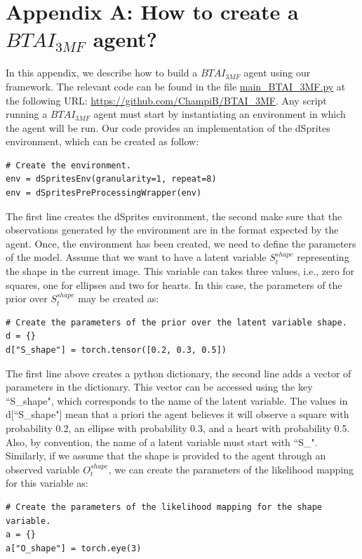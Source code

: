 \documentclass[twoside,11pt]{article}
\begin{document}

\vskip 0.2in


\section*{Appendix A: How to create a $BTAI_{3MF}$ agent?}

In this appendix, we describe how to build a $BTAI_{3MF}$ agent using our framework. The relevant code can be found in the file \url{main_BTAI_3MF.py} at the following URL: \url{https://github.com/ChampiB/BTAI_3MF}. Any script running a $BTAI_{3MF}$ agent must start by instantiating an environment in which the agent will be run. Our code provides an implementation of the dSprites environment, which can be created as follow:
\begin{verbatim}
# Create the environment.
env = dSpritesEnv(granularity=1, repeat=8)
env = dSpritesPreProcessingWrapper(env)
\end{verbatim}
The first line creates the dSprites environment, the second make sure that the observations generated by the environment are in the format expected by the agent. Once, the environment has been created, we need to define the parameters of the model. Assume that we want to have a latent variable $S_t^{shape}$ representing the shape in the current image. This variable can takes three values, i.e., zero for squares, one for ellipses and two for hearts. In this case, the parameters of the prior over $S_t^{shape}$ may be created as:
\begin{verbatim}
# Create the parameters of the prior over the latent variable shape.
d = {}
d["S_shape"] = torch.tensor([0.2, 0.3, 0.5])
\end{verbatim}
The first line above creates a python dictionary, the second line adds a vector of parameters in the dictionary. This vector can be accessed using the key ``S\_shape", which corresponds to the name of the latent variable. The values in d[``S\_shape"] mean that a priori the agent believes it will observe a square with probability 0.2, an ellipse with probability 0.3, and a heart with probability 0.5. Also, by convention, the name of a latent variable must start with ``S\_". Similarly, if we assume that the shape is provided to the agent through an observed variable $O_t^{shape}$, we can create the parameters of the likelihood mapping for this variable as:
\begin{verbatim}
# Create the parameters of the likelihood mapping for the shape variable.
a = {}
a["O_shape"] = torch.eye(3)
\end{verbatim}
\end{document}
